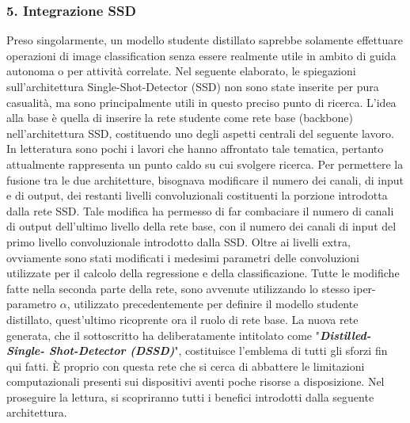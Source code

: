 \subsubsection{5. Integrazione SSD}
Preso singolarmente, un modello studente distillato saprebbe solamente 
effettuare operazioni di image classification senza essere realmente utile in 
ambito di guida autonoma o per attività correlate. Nel seguente elaborato, 
le spiegazioni sull'architettura Single-Shot-Detector (SSD) non sono state 
inserite per pura casualità, ma sono principalmente utili in questo preciso 
punto di ricerca. L'idea alla base è quella di inserire la rete studente come 
rete base (backbone) nell'architettura SSD, costituendo uno degli aspetti 
centrali del seguente lavoro. In letteratura sono pochi i lavori che hanno 
affrontato tale tematica, pertanto attualmente rappresenta un punto caldo 
su cui svolgere ricerca. Per permettere la fusione tra le due architetture, 
bisognava modificare il numero dei canali, di input e di output, dei restanti 
livelli convoluzionali costituenti la porzione introdotta dalla rete SSD. Tale 
modifica ha permesso di far combaciare il numero di canali di output 
dell'ultimo livello della rete base, con il numero dei canali di input del primo 
livello convoluzionale introdotto dalla SSD. Oltre ai livelli extra, ovviamente 
sono stati modificati i medesimi parametri delle convoluzioni utilizzate per il 
calcolo della regressione e della classificazione. Tutte le modifiche fatte nella 
seconda parte della rete, sono avvenute utilizzando lo stesso iper-parametro 
$\alpha$, utilizzato precedentemente per definire il modello studente distillato, 
quest'ultimo ricoprente ora il ruolo di rete base. La nuova rete generata, 
che il sottoscritto ha deliberatamente intitolato come "{\bfseries{\emph{Distilled-Single-
Shot-Detector (DSSD)}}}", costituisce l'emblema di tutti gli sforzi fin qui 
fatti. È proprio con questa rete che si cerca di abbattere le limitazioni 
computazionali presenti sui dispositivi aventi poche risorse a disposizione. 
Nel proseguire la lettura, si scopriranno tutti i benefici introdotti dalla 
seguente architettura.

